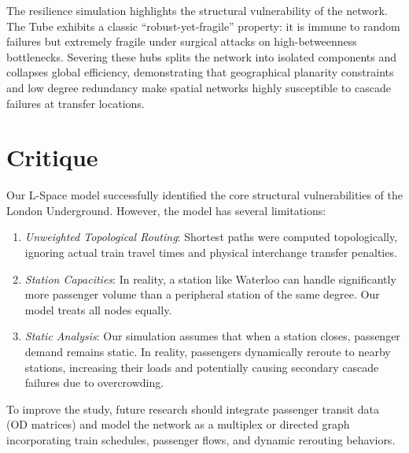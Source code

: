 \documentclass[12pt, a4paper]{article}
\begin{document}
The resilience simulation highlights the structural vulnerability of the network. The Tube exhibits a classic ``robust-yet-fragile'' property: it is immune to random failures but extremely fragile under surgical attacks on high-betweenness bottlenecks. Severing these hubs splits the network into isolated components and collapses global efficiency, demonstrating that geographical planarity constraints and low degree redundancy make spatial networks highly susceptible to cascade failures at transfer locations.

\section{Critique}
\label{critique}
Our L-Space model successfully identified the core structural vulnerabilities of the London Underground. However, the model has several limitations:
\begin{enumerate}
    \item \textit{Unweighted Topological Routing}: Shortest paths were computed topologically, ignoring actual train travel times and physical interchange transfer penalties.
    \item \textit{Station Capacities}: In reality, a station like Waterloo can handle significantly more passenger volume than a peripheral station of the same degree. Our model treats all nodes equally.
    \item \textit{Static Analysis}: Our simulation assumes that when a station closes, passenger demand remains static. In reality, passengers dynamically reroute to nearby stations, increasing their loads and potentially causing secondary cascade failures due to overcrowding.
\end{enumerate}

To improve the study, future research should integrate passenger transit data (OD matrices) and model the network as a multiplex or directed graph incorporating train schedules, passenger flows, and dynamic rerouting behaviors.
\end{document}
